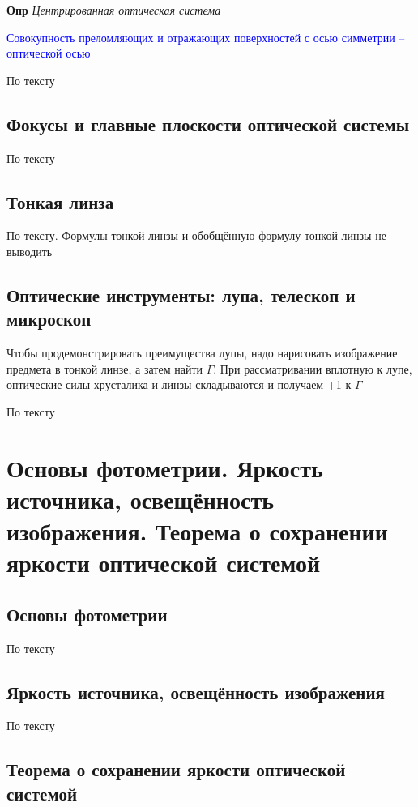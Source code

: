 \documentclass[a4paper, 14pt]{article}
\begin{document}
    \textbf{Опр} \textit{Центрированная оптическая система}
    
    \textcolor{blue}{Совокупность преломляющих и отражающих поверхностей с осью симметрии -- оптической осью}
    
    По тексту
    
    \subsection{Фокусы и главные плоскости оптической системы}
    
    По тексту
    
    \subsection{Тонкая линза}
    
    По тексту.
    Формулы тонкой линзы и обобщённую формулу тонкой линзы не выводить
    
    \subsection{Оптические инструменты: лупа, телескоп и микроскоп}
    
    Чтобы продемонстрировать преимущества лупы, надо нарисовать изображение предмета в тонкой линзе, а затем найти $\Gamma$.
    При рассматривании вплотную к лупе, оптические силы хрусталика и линзы складываются и получаем +1 к $\Gamma$
    
    По тексту
    
    \section{Основы фотометрии.
    Яркость источника, освещённость изображения.
    Теорема о сохранении яркости оптической системой}
    
    \subsection{Основы фотометрии}
    
    По тексту
    
    \subsection{Яркость источника, освещённость изображения}
    
    По тексту
    
    \subsection{Теорема о сохранении яркости оптической системой}
    
\end{document}
